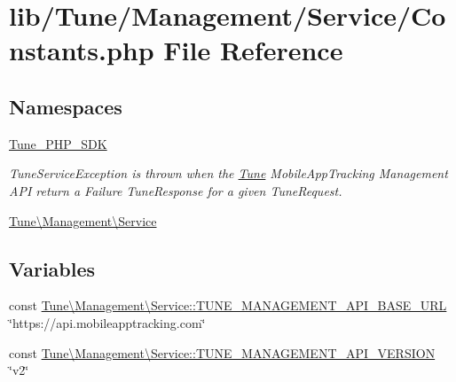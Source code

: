 \hypertarget{Constants_8php}{\section{lib/\-Tune/\-Management/\-Service/\-Constants.php File Reference}
\label{Constants_8php}
}
\subsection*{Namespaces}
\begin{DoxyCompactItemize}
\item 
\hyperlink{namespaceTune__PHP__SDK}{Tune\-\_\-\-P\-H\-P\-\_\-\-S\-D\-K}
\begin{DoxyCompactList}\small\item\em Tune\-Service\-Exception is thrown when the \hyperlink{namespaceTune}{Tune} Mobile\-App\-Tracking Management A\-P\-I return a Failure Tune\-Response for a given Tune\-Request. \end{DoxyCompactList}\item 
\hyperlink{namespaceTune_1_1Management_1_1Service}{Tune\textbackslash{}\-Management\textbackslash{}\-Service}
\end{DoxyCompactItemize}
\subsection*{Variables}
\begin{DoxyCompactItemize}
\item 
const \hyperlink{namespaceTune_1_1Management_1_1Service_a7bce96e6c1888a8f3b18a9802d6a2ced}{Tune\textbackslash{}\-Management\textbackslash{}\-Service\-::\-T\-U\-N\-E\-\_\-\-M\-A\-N\-A\-G\-E\-M\-E\-N\-T\-\_\-\-A\-P\-I\-\_\-\-B\-A\-S\-E\-\_\-\-U\-R\-L} \char`\"{}https\-://api.\-mobileapptracking.\-com\char`\"{}
\item 
const \hyperlink{namespaceTune_1_1Management_1_1Service_a4a4f959118a3c1ce5c479805610f9036}{Tune\textbackslash{}\-Management\textbackslash{}\-Service\-::\-T\-U\-N\-E\-\_\-\-M\-A\-N\-A\-G\-E\-M\-E\-N\-T\-\_\-\-A\-P\-I\-\_\-\-V\-E\-R\-S\-I\-O\-N} \char`\"{}v2\char`\"{}
\end{DoxyCompactItemize}
